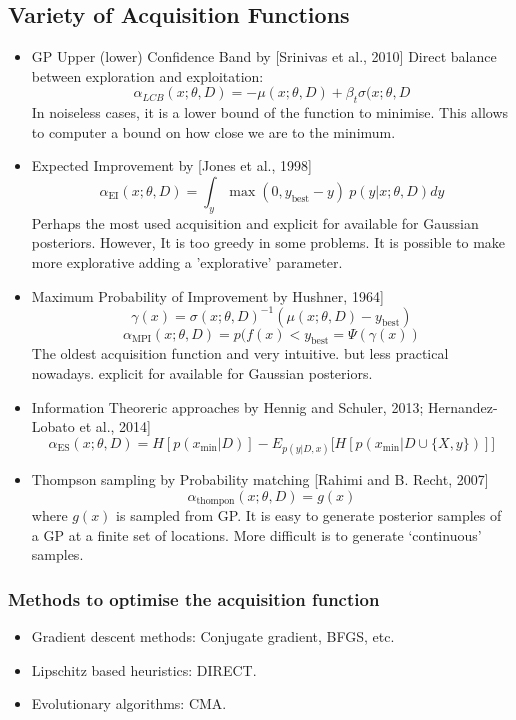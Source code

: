 \documentclass{article}
\theoremstyle{definition}
\begin{document}
\subsection{Variety of Acquisition Functions}
\begin{itemize}
    \item GP Upper (lower) Confidence Band by [Srinivas et al., 2010]
    Direct balance between exploration and exploitation:
    \[ \alpha_{\textit{LCB}}(x; \theta, D) = - \mu(x; \theta, D) + \beta_t \sigma(x; \theta, D \]
    In noiseless cases, it is a lower bound of the function to minimise.
    This allows to computer a bound on how close we are to the minimum.
    \item Expected Improvement by [Jones et al., 1998]
    \[ \alpha_{\text{EI}}(x;\theta, D) = \int_y \max(0, y_{\text{best}} - y) \ p(y|x; \theta,D) dy \]
    Perhaps the most used acquisition and explicit for available for Gaussian posteriors. However, It is too greedy in some problems. It is possible to make more explorative adding a ’explorative’ parameter.
    \item Maximum Probability of Improvement by Hushner, 1964]
    \[ \gamma(x) = \sigma(x; \theta, D)^{-1} (\mu(x; \theta, D) - y_{\text{best}}) \]
    \[ \alpha_{\text{MPI}}(x; \theta, D) = p(f(x) < y_{\text{best}} = \Psi(\gamma(x)) \] The oldest acquisition function and very intuitive. but less practical nowadays. explicit for available for Gaussian posteriors.
    \item Information Theoreric approaches by Hennig and Schuler, 2013; Hernandez-Lobato et al., 2014]
    \[ \alpha_{\text{ES}}(x; \theta, D) = H[p(x_{\text{min}}|D)] - E_{p(y|D,x)} \Big[H[p(x_{\text{min}} | D \cup \{ X,y \})] \Big] \]
    \item Thompson sampling by Probability matching [Rahimi and B. Recht, 2007]
    \[ \alpha_{\text{thompon}}(x;\theta,D) = g(x) \] where $g(x)$ is sampled from GP.
    It is easy to generate posterior samples of a GP at a finite set of locations. More difficult is to generate ‘continuous’ samples.
\end{itemize}

\subsubsection{Methods to optimise the acquisition function}
\begin{itemize}
    \item Gradient descent methods: Conjugate gradient, BFGS, etc.
    \item Lipschitz based heuristics: DIRECT.
    \item Evolutionary algorithms: CMA.
\end{itemize}
\end{document}
